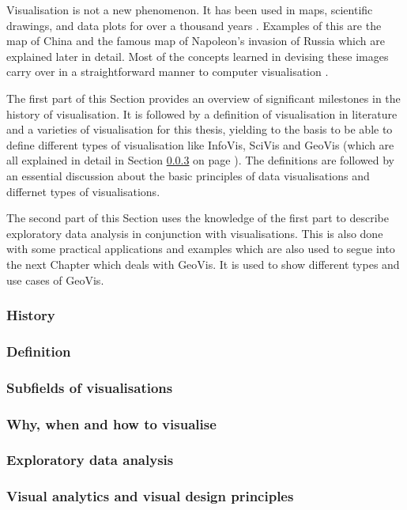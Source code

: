 Visualisation is not a new phenomenon. It has been used in maps, scientific drawings, and data plots for over a thousand years . Examples of this are the map of China and the famous map of Napoleon's invasion of Russia which are explained later in detail. Most of the concepts learned in devising these images carry over in a straightforward manner to computer visualisation .

The first part of this Section provides an overview of significant milestones in the history of visualisation. It is followed by a definition of visualisation in literature and a varieties of visualisation for this thesis, yielding to the basis to be able to define different types of visualisation like \ac{InfoVis}, \ac{SciVis} and \ac{GeoVis} (which are all explained in detail in Section \ref{s:definitions-types} on page \pageref{s:definitions-types}). The definitions are followed by an essential discussion about the basic principles of data visualisations and differnet types of visualisations.

The second part of this Section uses the knowledge of the first part to describe exploratory data analysis in conjunction with visualisations. This is also done with some practical applications and examples which are also used to segue into the next Chapter which deals with \ac{GeoVis}. It is used to show different types and use cases of \ac{GeoVis}.

\subsubsection{History}
\label{s:history}


\subsubsection{Definition}
\label{s:definition}


\subsubsection{Subfields of visualisations}
\label{s:definitions-types}


\subsubsection{Why, when and how to visualise}
\label{s:basics}


\subsubsection{Exploratory data analysis}
\label{s:eda}



\subsubsection{Visual analytics and visual design principles}
\label{s:va}

